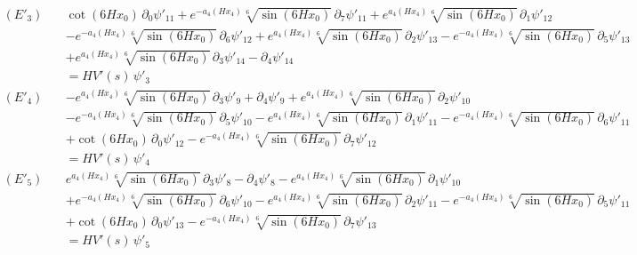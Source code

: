 \begin{align*}
(E'_{3})\quad & \cot \left(6 H x_0\right)\,\partial_{0}\psi'_{11} + e^{-a_4\left(H x_4\right)} \sqrt[6]{\sin \left(6 H x_0\right)}\,\partial_{7}\psi'_{11} + e^{a_4\left(H x_4\right)} \sqrt[6]{\sin \left(6 H x_0\right)}\,\partial_{1}\psi'_{12} \\
 &  - e^{-a_4\left(H x_4\right)} \sqrt[6]{\sin \left(6 H x_0\right)}\,\partial_{6}\psi'_{12} + e^{a_4\left(H x_4\right)} \sqrt[6]{\sin \left(6 H x_0\right)}\,\partial_{2}\psi'_{13} - e^{-a_4\left(H x_4\right)} \sqrt[6]{\sin \left(6 H x_0\right)}\,\partial_{5}\psi'_{13} \\
 &  + e^{a_4\left(H x_4\right)} \sqrt[6]{\sin \left(6 H x_0\right)}\,\partial_{3}\psi'_{14} - \partial_{4}\psi'_{14} \\
 & = H V'(s)\,\psi'_{3}
\end{align*}
\begin{align*}
(E'_{4})\quad & -e^{a_4\left(H x_4\right)} \sqrt[6]{\sin \left(6 H x_0\right)}\,\partial_{3}\psi'_{9} + \partial_{4}\psi'_{9} + e^{a_4\left(H x_4\right)} \sqrt[6]{\sin \left(6 H x_0\right)}\,\partial_{2}\psi'_{10} \\
 &  - e^{-a_4\left(H x_4\right)} \sqrt[6]{\sin \left(6 H x_0\right)}\,\partial_{5}\psi'_{10} - e^{a_4\left(H x_4\right)} \sqrt[6]{\sin \left(6 H x_0\right)}\,\partial_{1}\psi'_{11} - e^{-a_4\left(H x_4\right)} \sqrt[6]{\sin \left(6 H x_0\right)}\,\partial_{6}\psi'_{11} \\
 &  + \cot \left(6 H x_0\right)\,\partial_{0}\psi'_{12} - e^{-a_4\left(H x_4\right)} \sqrt[6]{\sin \left(6 H x_0\right)}\,\partial_{7}\psi'_{12} \\
 & = H V'(s)\,\psi'_{4}
\end{align*}
\begin{align*}
(E'_{5})\quad & e^{a_4\left(H x_4\right)} \sqrt[6]{\sin \left(6 H x_0\right)}\,\partial_{3}\psi'_{8} - \partial_{4}\psi'_{8} - e^{a_4\left(H x_4\right)} \sqrt[6]{\sin \left(6 H x_0\right)}\,\partial_{1}\psi'_{10} \\
 &  + e^{-a_4\left(H x_4\right)} \sqrt[6]{\sin \left(6 H x_0\right)}\,\partial_{6}\psi'_{10} - e^{a_4\left(H x_4\right)} \sqrt[6]{\sin \left(6 H x_0\right)}\,\partial_{2}\psi'_{11} - e^{-a_4\left(H x_4\right)} \sqrt[6]{\sin \left(6 H x_0\right)}\,\partial_{5}\psi'_{11} \\
 &  + \cot \left(6 H x_0\right)\,\partial_{0}\psi'_{13} - e^{-a_4\left(H x_4\right)} \sqrt[6]{\sin \left(6 H x_0\right)}\,\partial_{7}\psi'_{13} \\
 & = H V'(s)\,\psi'_{5}
\end{align*}

